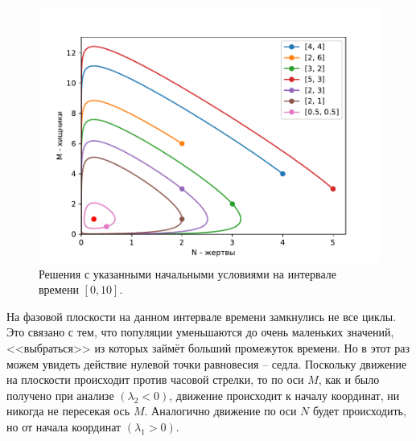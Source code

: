         \begin{figure}[H]
            \centering
            \includegraphics[width=15cm]{pictures/population5.pdf}
            \caption{Решения с указанными начальными условиями на интервале времени $ [0, 10] $.}
        \end{figure}
        На фазовой плоскости на данном интервале времени замкнулись не все циклы. Это связано с тем, что популяции уменьшаются до очень маленьких значений, <<выбраться>> из которых займёт больший промежуток времени. Но в этот раз можем увидеть действие нулевой точки равновесия -- седла. Поскольку движение на плоскости происходит против часовой стрелки, то по оси $ M $, как и было получено при анализе $(\lambda_2 < 0)$, движение происходит к началу координат, ни никогда не пересекая ось $ M $. Аналогично движение по оси $N$ будет происходить, но от начала координат $(\lambda_1 > 0)$. 


